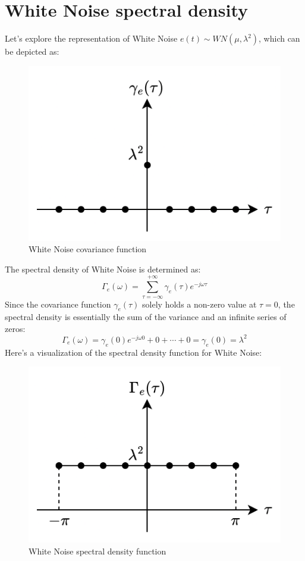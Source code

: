 \section{White Noise spectral density}

Let's explore the representation of White Noise $e(t) \sim WN (\mu,\lambda^2)$, which can be depicted as:
\begin{figure}[H]
    \centering
    \includegraphics[width=0.35\linewidth]{images/wn1.png}
    \caption{White Noise covariance function}
\end{figure}

The spectral density of White Noise is determined as:
\[\Gamma_e(\omega)=\sum_{\tau=-\infty}^{+\infty}\gamma_e(\tau)e^{-j\omega\tau}\]
Since the covariance function $\gamma_e(\tau)$ solely holds a non-zero value at $\tau=0$, the spectral density is essentially the sum of the variance and an infinite series of zeros:
\[\Gamma_e(\omega)=\gamma_e(0)e^{-j\omega 0}+0+\cdots+0=\gamma_e(0)=\lambda^2\]
Here's a visualization of the spectral density function for White Noise:
\begin{figure}[H]
    \centering
    \includegraphics[width=0.35\linewidth]{images/wn2.png}
    \caption{White Noise spectral density function}
\end{figure}